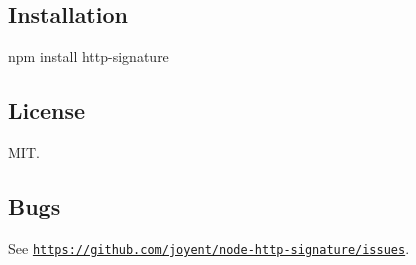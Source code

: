\subsection*{Installation}

\begin{DoxyVerb}npm install http-signature
\end{DoxyVerb}


\subsection*{License}

M\+I\+T.

\subsection*{Bugs}

See \href{https://github.com/joyent/node-http-signature/issues}{\tt https\+://github.\+com/joyent/node-\/http-\/signature/issues}. 